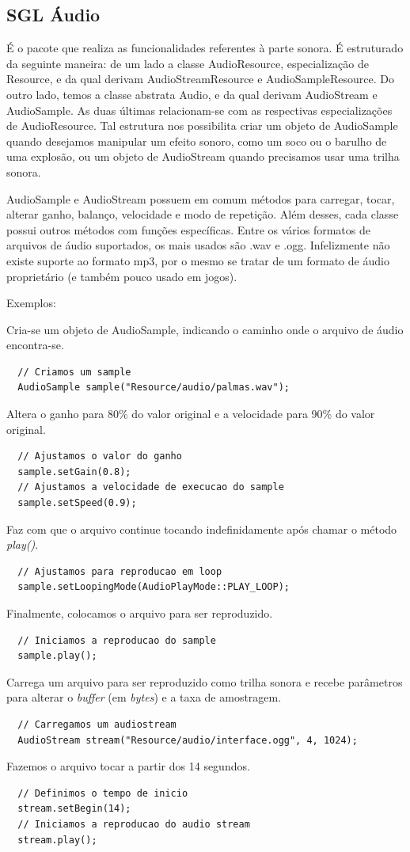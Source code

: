 \subsection{SGL Áudio}
%
%
É o pacote que realiza as funcionalidades referentes à parte sonora. É estruturado da seguinte maneira: de um lado a classe AudioResource, especialização de Resource, e da qual derivam AudioStreamResource  e AudioSampleResource. Do outro lado, temos a classe abstrata Audio, e da qual derivam AudioStream  e AudioSample. As duas últimas relacionam-se com as respectivas especializações de AudioResource. Tal estrutura nos possibilita criar um objeto de AudioSample quando desejamos manipular um efeito sonoro, como um soco ou o barulho de uma explosão, ou um objeto de AudioStream quando precisamos usar uma trilha sonora.
\par 
AudioSample e AudioStream possuem em comum métodos para carregar, tocar, alterar ganho, balanço, velocidade e modo de repetição. Além desses, cada classe possui outros métodos com funções específicas. Entre os vários formatos de arquivos de áudio suportados, os mais usados são .wav e .ogg. Infelizmente não existe suporte ao formato mp3, por o mesmo se tratar de um formato de áudio proprietário (e também pouco usado em jogos).
\par
Exemplos:
\par 
Cria-se um objeto de  AudioSample, indicando o caminho onde o arquivo de áudio encontra-se.
%
\begin{lstlisting}
  // Criamos um sample
  AudioSample sample("Resource/audio/palmas.wav");
\end{lstlisting}
%
Altera o ganho para 80\% do valor original e a velocidade para 90\% do valor original.
%
\begin{lstlisting}
  // Ajustamos o valor do ganho
  sample.setGain(0.8);
  // Ajustamos a velocidade de execucao do sample
  sample.setSpeed(0.9);
\end{lstlisting}
%
Faz com que o arquivo continue tocando indefinidamente após chamar o método \textit{play()}.
%
\begin{lstlisting}
  // Ajustamos para reproducao em loop
  sample.setLoopingMode(AudioPlayMode::PLAY_LOOP);
\end{lstlisting}
%
Finalmente, colocamos o arquivo para ser reproduzido.
%
\begin{lstlisting}
  // Iniciamos a reproducao do sample
  sample.play();
\end{lstlisting}
%
%
Carrega um arquivo para ser reproduzido como trilha sonora e recebe parâmetros para alterar o \textit{buffer} (em \textit{bytes}) e a taxa de amostragem.
%
\begin{lstlisting}
  // Carregamos um audiostream
  AudioStream stream("Resource/audio/interface.ogg", 4, 1024);
\end{lstlisting}
%
Fazemos o arquivo tocar a partir dos 14 segundos.
%
\begin{lstlisting}
  // Definimos o tempo de inicio
  stream.setBegin(14);
  // Iniciamos a reproducao do audio stream
  stream.play();
\end{lstlisting}
%
%
%
